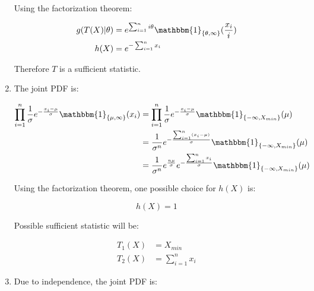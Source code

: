 \documentclass[11pt,letterpaper,titlepage]{article}
\begin{document}
\begin{enumerate}
    Using the factorization theorem:
    
    \begin{equation*}
        \begin{aligned}
            g(T(X)|\theta) &= e^{\sum_{i = 1}^{n}i \theta} \mathbbm{1}_{\{ \theta, \infty\}}(\frac{x_i}{i}) \\
            h(X) &= e^{- \sum_{i = 1}^{n} x_i}
        \end{aligned}
    \end{equation*}
    
    Therefore $T$ is a sufficient statistic.
    
    \item %
    
    The joint PDF is:
    
    \begin{equation*}
        \begin{aligned}
            \prod_{i = 1}^{n} \frac{1}{\sigma} e^{- \frac{x_i - \mu}{\sigma}} \mathbbm{1}_{\{\mu, \infty\}}(x_i) &= \prod_{i = 1}^{n} \frac{1}{\sigma} e^{- \frac{x_i - \mu}{\sigma}} \mathbbm{1}_{\{-\infty, X_{min}\}}(\mu) \\
            &= \frac{1}{\sigma^n} e^{-\frac{\sum_{i = 1}^{n} (x_i - \mu)}{\sigma}} \mathbbm{1}_{\{-\infty, X_{min}\}}(\mu) \\
            &= \frac{1}{\sigma^n} e^{\frac{n \mu}{\sigma}} e^{-\frac{\sum_{i = 1}^{n} x_i}{\sigma}} \mathbbm{1}_{\{-\infty, X_{min}\}}(\mu)
        \end{aligned}
    \end{equation*}
    
    Using the factorization theorem, one possible choice for $h(X)$ is:
    
    \begin{equation*}
        h(X) = 1
    \end{equation*}
    
    Possible sufficient statistic will be:
    
    \begin{equation*}
        \begin{aligned}
            T_1(X) &= X_{min} \\
            T_2(X) &= \sum_{i = 1}^{n} x_i
        \end{aligned}
    \end{equation*}
    
    \item %
    
    Due to independence, the joint PDF is:
    

\end{enumerate}
\end{document}
